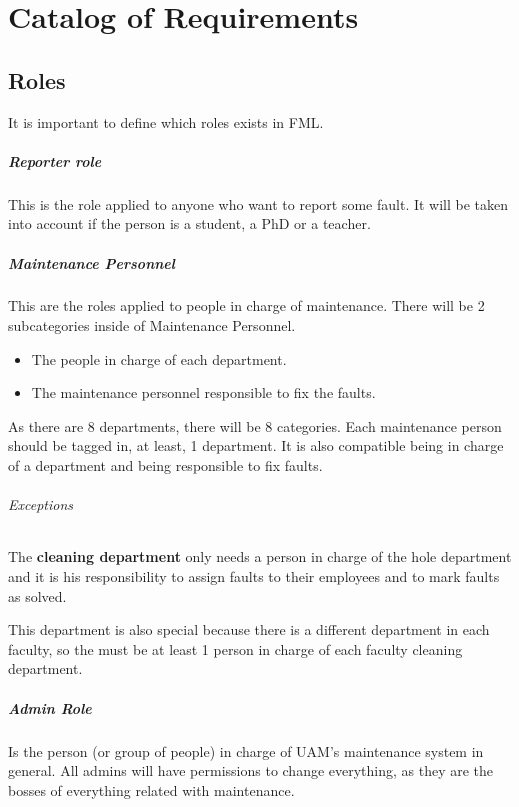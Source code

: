\chapter{Catalog of Requirements}
\label{chapRequirements}
\section{Roles}
It is important to define which roles exists in FML.

\paragraph{Reporter role} \label{ReporterRole} This is the role applied to anyone who want to report some fault. It will be taken into account if the person is a student, a PhD or a teacher. 

\paragraph{Maintenance Personnel} \label{MaintenancePersonnel}

This are the roles applied to people in charge of maintenance. There will be 2 subcategories inside of Maintenance Personnel. 

\begin{itemize}
\item The people in charge of each department.
\item The maintenance personnel responsible to fix the faults.
\end{itemize}

As there are 8 departments, there will be 8 categories. Each maintenance person should be tagged in, at least, 1 department. It is also compatible being in charge of a department and being responsible to fix faults.

\subparagraph{Exceptions} The \textbf{cleaning department} only needs a person in charge of the hole department and it is his responsibility to assign faults to their employees and to mark faults as solved. 

This department is also special because there is a different department in each faculty, so the must be at least 1 person in charge of each faculty cleaning department.

\paragraph{Admin Role} Is the person (or group of people) in charge of UAM's maintenance system in general. All admins will have permissions to change everything, as they are the bosses of everything related with maintenance.

